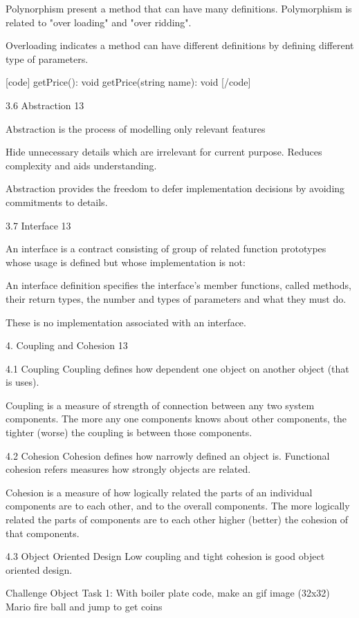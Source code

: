 Polynorphism present a method that can have many definitions. Polymorphism is related to "over loading" and "over ridding".

Overloading indicates a method can have different definitions by defining different type of parameters.

[code] getPrice(): void getPrice(string name): void [/code]

3.6 Abstraction 13

Abstraction is the process of modelling only relevant features

Hide unnecessary details which are irrelevant for current purpose.
Reduces complexity and aids understanding.

Abstraction provides the freedom to defer implementation decisions by avoiding commitments to details.

3.7 Interface 13

An interface is a contract consisting of group of related function prototypes whose usage is defined but whose implementation is not:

An interface definition specifies the interface's member functions, called methods, their return types, the number and types of parameters and what they must do.

These is no implementation associated with an interface.

4. Coupling and Cohesion
13

4.1 Coupling
Coupling defines how dependent one object on another object (that is uses).

Coupling is a measure of strength of connection between any two system components. The more any one components knows about other components, the tighter (worse) the coupling is between those components.

4.2 Cohesion
Cohesion defines how narrowly defined an object is. Functional cohesion refers measures how strongly objects are related.

Cohesion is a measure of how logically related the parts of an individual components are to each other, and to the overall components. The more logically related the parts of components are to each other higher (better) the cohesion of that components.

4.3 Object Oriented Design
Low coupling and tight cohesion is good object oriented design.

Challenge
Object
Task 1: With boiler plate code, make an gif image (32x32) Mario fire ball and jump to get coins


